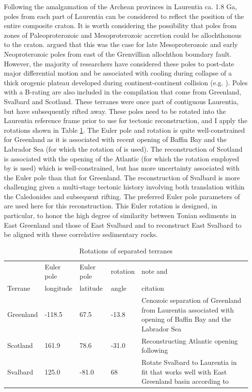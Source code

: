 \documentclass[twocolumn, switch]{article} %
\begin{document}
Following the amalgamation of the Archean provinces in Laurentia ca. 1.8 Ga, poles from each part of Laurentia can be considered to reflect the position of the entire composite craton. It is worth considering the possibility that poles from zones of Paleoproterozoic and Mesoproterozoic accretion could be allochthonous to the craton. \cite{Halls2015b} argued that this was the case for late Mesoproterozoic and early Neoproterozoic poles from east of the Grenvillian allochthon boundary fault. However, the majority of researchers have considered these poles to post-date major differential motion and be associated with cooling during collapse of a thick orogenic plateau developed during continent-continent collision (e.g. \citealp{Brown2012a}). Poles with a B-rating are also included in the compilation that come from Greenland, Svalbard and Scotland. These terranes were once part of contiguous Laurentia, but have subsequently rifted away. These poles need to be rotated into the Laurentia reference frame prior to use for tectonic reconstruction, and I apply the rotations shown in Table \ref{tab:terrane_rotations}. The Euler pole and rotation is quite well-constrained for Greenland as it is associated with recent opening of Baffin Bay and the Labrador Sea (for which the rotation of \citealp{Roest1989a} is used). The reconstruction of Scotland is associated with the opening of the Atlantic (for which the rotation employed by \citealp{Torsvik2017a} is used) which is well-constrained, but has more uncertainty associated with the Euler pole than that for Greenland. The reconstruction of Svalbard is more challenging given a multi-stage tectonic history involving both translation within the Caledonides and subsequent rifting. The preferred Euler pole parameters of \cite{Maloof2006a} are used here for this reconstruction. This Euler rotation is designed, in particular, to honor the high degree of similarity between Tonian sediments in East Greenland \citep{Hoffman2012a} and those of East Svalbard \citep{Maloof2006a} and to reconstruct East Svalbard to be aligned with these correlative sedimentary rocks.

\begin{table}[hbt]
\caption{Rotations of separated terranes}
{\scriptsize
\begin{tabular}{|l|l|l|l|p{1.1 in}|}
  \hline
& Euler pole & Euler pole & rotation & note and \\
Terrane & longitude & latitude & angle & citation \\
\hline
Greenland & -118.5 & 67.5 & -13.8 & Cenozoic separation of Greenland from Laurentia associated with opening of Baffin Bay and the Labrador Sea \citep{Roest1989a} \\
\hline
Scotland & 161.9 & 78.6 & -31.0 & Reconstructing Atlantic opening following \cite{Torsvik2017a} \\
\hline
Svalbard & 125.0 & -81.0 & 68 & Rotate Svalbard to Laurentia in fit that works well with East Greenland basin according to \cite{Maloof2006a}\\
\hline
\end{tabular}
}
\label{tab:terrane_rotations}
\end{table}
\end{document}
